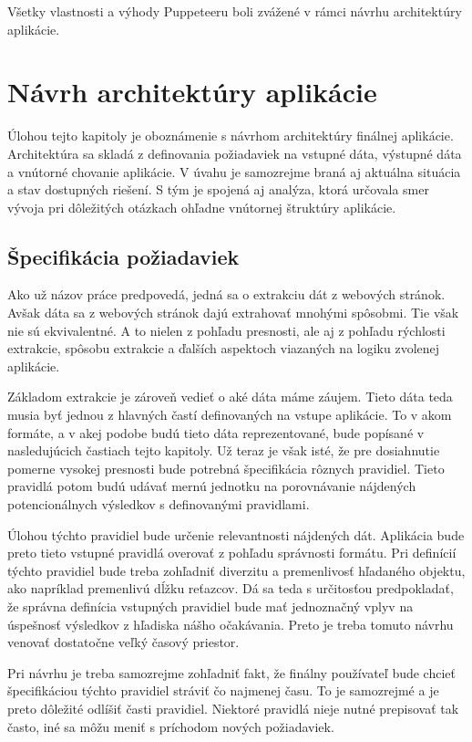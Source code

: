 Všetky vlastnosti a výhody Puppeteeru boli zvážené v rámci návrhu architektúry aplikácie.

\chapter{Návrh architektúry aplikácie}
\label{Navrh}
Úlohou tejto kapitoly je oboznámenie s návrhom architektúry finálnej aplikácie. Architektúra sa skladá z definovania požiadaviek na vstupné dáta, výstupné dáta a vnútorné chovanie aplikácie. V úvahu je samozrejme braná aj aktuálna situácia a stav dostupných riešení.  S tým je spojená aj analýza, ktorá určovala smer vývoja pri dôležitých otázkach ohľadne vnútornej štruktúry aplikácie.

\section{Špecifikácia požiadaviek}

Ako už názov práce predpovedá, jedná sa o extrakciu dát z webových stránok. Avšak dáta sa z webových stránok dajú extrahovať mnohými spôsobmi. Tie však nie sú ekvivalentné. A to nielen z pohľadu presnosti, ale aj z pohľadu rýchlosti extrakcie, spôsobu extrakcie a ďalších aspektoch viazaných na logiku zvolenej aplikácie.

Základom extrakcie je zároveň vedieť o aké dáta máme záujem. Tieto dáta teda musia byť jednou z hlavných častí definovaných na vstupe aplikácie. To v akom formáte, a v akej podobe budú tieto dáta reprezentované, bude popísané v nasledujúcich častiach tejto kapitoly. Už teraz je však isté, že pre dosiahnutie pomerne vysokej presnosti bude potrebná špecifikácia rôznych pravidiel. Tieto pravidlá potom budú udávať mernú jednotku na porovnávanie nájdených potencionálnych výsledkov s definovanými pravidlami.

Úlohou týchto pravidiel bude určenie relevantnosti nájdených dát. Aplikácia bude preto tieto vstupné pravidlá overovať z pohľadu správnosti formátu. Pri definícií týchto pravidiel bude treba zohľadniť diverzitu a premenlivosť hľadaného objektu, ako napríklad premenlivú dĺžku reťazcov. Dá sa teda s určitosťou predpokladať, že správna definícia vstupných pravidiel bude mať jednoznačný vplyv na úspešnosť výsledkov z hľadiska nášho očakávania. Preto je treba tomuto návrhu venovať dostatočne veľký časový priestor.

Pri návrhu je treba samozrejme zohľadniť fakt, že finálny používateľ bude chcieť špecifikáciou týchto pravidiel stráviť čo najmenej času. To je samozrejmé a je preto dôležité odlíšiť časti pravidiel. Niektoré pravidlá nieje nutné prepisovať tak často, iné sa môžu meniť s príchodom nových požiadaviek.

